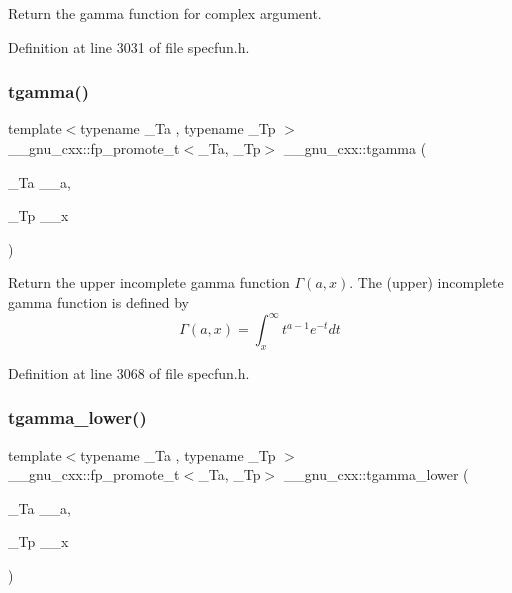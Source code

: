 Return the gamma function for complex argument. 

Definition at line 3031 of file specfun.\+h.

\mbox{\label{group__gnu__math__spec__func_ga264207c0040cd3877fad455121da8518}} 
\subsubsection{\texorpdfstring{tgamma()}{tgamma()}\hspace{0.1cm}{\footnotesize\ttfamily [3/3]}}
{\footnotesize\ttfamily template$<$typename \+\_\+\+Ta , typename \+\_\+\+Tp $>$ \\
\+\_\+\+\_\+gnu\+\_\+cxx\+::fp\+\_\+promote\+\_\+t$<$\+\_\+\+Ta, \+\_\+\+Tp$>$ \+\_\+\+\_\+gnu\+\_\+cxx\+::tgamma (\begin{DoxyParamCaption}\item[{\+\_\+\+Ta}]{\+\_\+\+\_\+a,  }\item[{\+\_\+\+Tp}]{\+\_\+\+\_\+x }\end{DoxyParamCaption})\hspace{0.3cm}{\ttfamily [inline]}}

Return the upper incomplete gamma function $ \Gamma(a,x) $. The (upper) incomplete gamma function is defined by \[ \Gamma(a,x) = \int_x^\infty t^{a-1}e^{-t}dt \] 

Definition at line 3068 of file specfun.\+h.

\mbox{\label{group__gnu__math__spec__func_gaed107908dec8865ea48e7764f7ea88a2}} 
\subsubsection{\texorpdfstring{tgamma\+\_\+lower()}{tgamma\_lower()}}
{\footnotesize\ttfamily template$<$typename \+\_\+\+Ta , typename \+\_\+\+Tp $>$ \\
\+\_\+\+\_\+gnu\+\_\+cxx\+::fp\+\_\+promote\+\_\+t$<$\+\_\+\+Ta, \+\_\+\+Tp$>$ \+\_\+\+\_\+gnu\+\_\+cxx\+::tgamma\+\_\+lower (\begin{DoxyParamCaption}\item[{\+\_\+\+Ta}]{\+\_\+\+\_\+a,  }\item[{\+\_\+\+Tp}]{\+\_\+\+\_\+x }\end{DoxyParamCaption})\hspace{0.3cm}{\ttfamily [inline]}}

